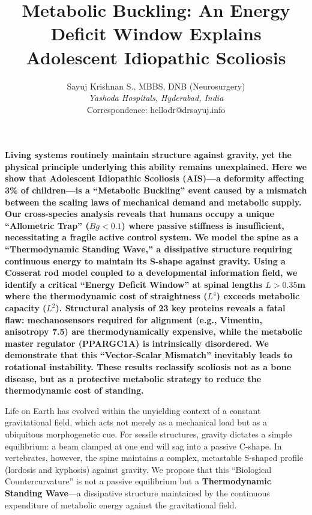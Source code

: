 \documentclass[12pt]{article}
\title{Metabolic Buckling: An Energy Deficit Window Explains Adolescent Idiopathic Scoliosis}
\author{Sayuj Krishnan S., MBBS, DNB (Neurosurgery) \\
\textit{Yashoda Hospitals, Hyderabad, India} \\
Correspondence: hellodr@drsayuj.info}
\date{}
\begin{document}
\maketitle
\linenumbers
\doublespacing

\textbf{Living systems routinely maintain structure against gravity, yet the physical principle underlying this ability remains unexplained. Here we show that Adolescent Idiopathic Scoliosis (AIS)—a deformity affecting 3\% of children—is a ``Metabolic Buckling'' event caused by a mismatch between the scaling laws of mechanical demand and metabolic supply. Our cross-species analysis reveals that humans occupy a unique ``Allometric Trap'' ($Bg < 0.1$) where passive stiffness is insufficient, necessitating a fragile active control system. We model the spine as a ``Thermodynamic Standing Wave,'' a dissipative structure requiring continuous energy to maintain its S-shape against gravity. Using a Cosserat rod model coupled to a developmental information field, we identify a critical ``Energy Deficit Window'' at spinal lengths $L > 0.35$m where the thermodynamic cost of straightness ($L^4$) exceeds metabolic capacity ($L^2$). Structural analysis of 23 key proteins reveals a fatal flaw: mechanosensors required for alignment (e.g., Vimentin, anisotropy 7.5) are thermodynamically expensive, while the metabolic master regulator (PPARGC1A) is intrinsically disordered. We demonstrate that this ``Vector-Scalar Mismatch'' inevitably leads to rotational instability. These results reclassify scoliosis not as a bone disease, but as a protective metabolic strategy to reduce the thermodynamic cost of standing.}

\vspace{1em}

Life on Earth has evolved within the unyielding context of a constant gravitational field, which acts not merely as a mechanical load but as a ubiquitous morphogenetic cue\cite{thompson1917}. For sessile structures, gravity dictates a simple equilibrium: a beam clamped at one end will sag into a passive C-shape. In vertebrates, however, the spine maintains a complex, metastable S-shaped profile (lordosis and kyphosis) against gravity\cite{latimer2005}. We propose that this ``Biological Countercurvature'' is not a passive equilibrium but a \textbf{Thermodynamic Standing Wave}—a dissipative structure maintained by the continuous expenditure of metabolic energy against the gravitational field.
\end{document}

